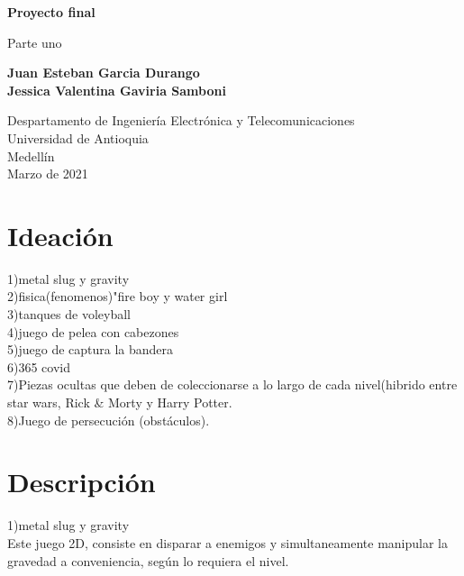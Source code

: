 \documentclass{article}
\begin{document}
\begin{titlepage}
    \begin{center}
        \vspace*{1cm}
            
        \Huge
        \textbf{Proyecto final}
            
        \vspace{0.5cm}
        \LARGE
        Parte uno
            
        \vspace{1.5cm}
            
        \textbf{Juan Esteban Garcia Durango\\
            Jessica Valentina Gaviria Samboni }
        \vfill
            
        \vspace{0.8cm}
            
        \Large
        Despartamento de Ingeniería Electrónica y Telecomunicaciones\\
        Universidad de Antioquia\\
        Medellín\\
        Marzo de 2021
            
    \end{center}
\end{titlepage}

\tableofcontents
\newpage
\section{Ideación}\label{intro}
1)metal slug y gravity\\
2)fisica(fenomenos)"fire boy y water girl\\
3)tanques de voleyball\\
4)juego de pelea con cabezones\\
5)juego de captura la bandera\\
6)365 covid\\
7)Piezas ocultas que deben de coleccionarse a lo largo de cada nivel(hibrido entre star wars, Rick & Morty y Harry Potter.\\
8)Juego de persecución (obstáculos).\\

\section{Descripción} \label{Descripción}
 1)metal slug y gravity\\
Este juego 2D, consiste en disparar a enemigos y simultaneamente manipular la gravedad a conveniencia, según lo requiera el nivel.\\
\end{document}
